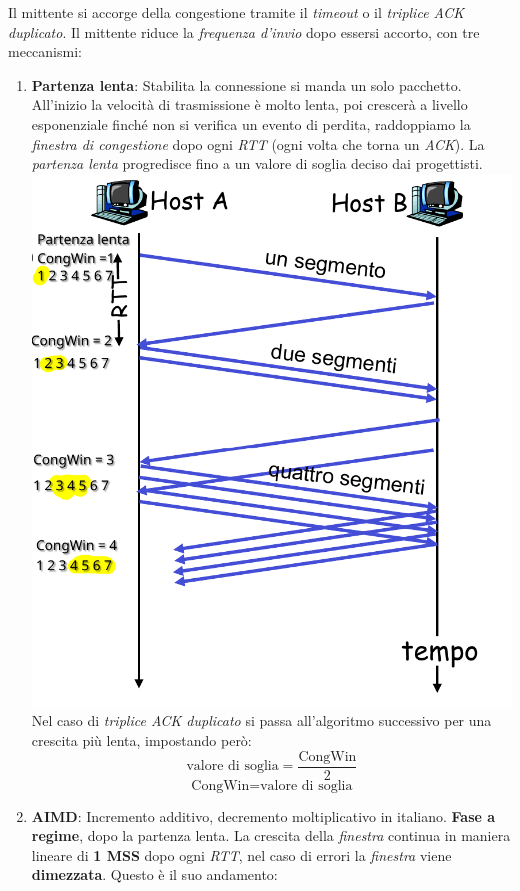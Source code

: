 Il mittente si accorge della congestione tramite il \textit{timeout} o il \textit{triplice ACK duplicato}.
Il mittente riduce la \textit{frequenza d'invio} dopo essersi accorto, con tre meccanismi:
\begin{enumerate}
  \item \textbf{Partenza lenta}: Stabilita la connessione si manda un solo pacchetto. All'inizio la velocità di trasmissione è molto lenta, poi crescerà a livello esponenziale finché non si verifica un evento di perdita, raddoppiamo la \textit{finestra di congestione} dopo ogni \textit{RTT} (ogni volta che torna un \textit{ACK}). La \textit{partenza lenta} progredisce fino a un valore di soglia deciso dai progettisti. \\ 
    \includegraphics[width=\textwidth]{./img/partenzalenta.png} \\
    Nel caso di \textit{triplice ACK duplicato} si passa all'algoritmo successivo per una crescita più lenta, impostando però:
    \[\text{valore di soglia} = \frac{\text{CongWin}}{2}\]
    \[\text{CongWin} = \text{valore di soglia}\]
  \item \textbf{AIMD}: Incremento additivo, decremento moltiplicativo in italiano. \textbf{Fase a regime}, dopo la partenza lenta. La crescita della \textit{finestra} continua in maniera lineare di \textbf{1 MSS} dopo ogni \textit{RTT}, nel caso di errori la \textit{finestra} viene \textbf{dimezzata}. Questo è il suo andamento: \\

\end{enumerate}
